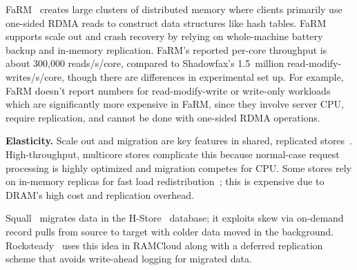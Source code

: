 
FaRM~\cite{farm-2014,farm-txns} creates large clusters of distributed memory where
clients primarily use one-sided RDMA reads to construct data structures like
hash tables. FaRM supports scale out and crash recovery by relying on
whole-machine battery backup and in-memory replication.  FaRM's reported
per-core throughput is about 300,000 reads/s/core, compared to Shadowfax's
1.5~million read-modify-writes/s/core, though there are differences in
experimental set up. For example, FaRM doesn't report numbers for
read-modify-write or write-only workloads which are significantly more
expensive in FaRM, since they involve server CPU, require replication, and
cannot be done with one-sided RDMA operations.


\noindent
{\bf Elasticity.}
Scale out and migration are key features in shared,
replicated stores~\cite{dynamo,cassandra,redis}.  High-throughput, multicore
stores complicate this because normal-case request processing is highly
optimized and migration competes for CPU.  Some stores rely on
in-memory replicas for fast load redistribution~\cite{farm-txns,drtmb};
this is expensive due to DRAM's high cost and
replication overhead.

Squall~\cite{squall} migrates data in the H-Store~\cite{hstore}
database; it exploits skew via on-demand record pulls from
source to target with colder data moved in the background.
Rocksteady~\cite{rocksteady} uses this idea in RAMCloud along with a
deferred replication scheme that avoids write-ahead logging for
migrated data.
